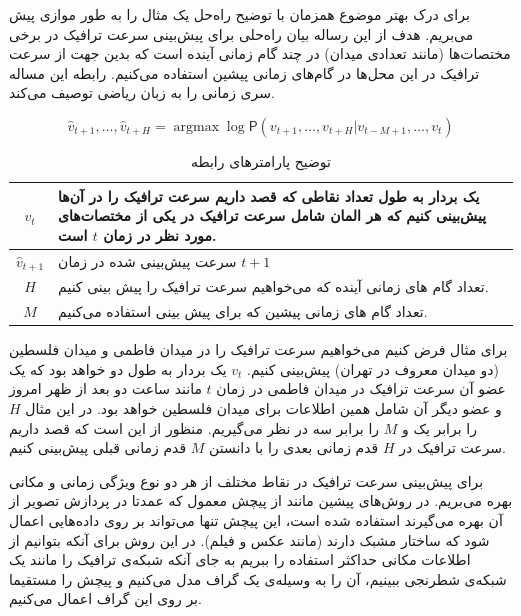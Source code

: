 
برای درک بهتر موضوع همزمان با توضیح راه‌حل یک مثال را به طور موازی پیش می‌بریم.
هدف از این رساله بیان راه‌حلی برای پیش‌بینی سرعت ترافیک در برخی مختصات‌ها (مانند تعدادی میدان) در چند گام زمانی آینده است که
بدین جهت از سرعت ترافیک در این محل‌ها در گام‌های زمانی پیشین استفاده می‌کنیم. رابطه  این مساله سری زمانی را به زبان ریاضی توصیف می‌کند.

\begin{equation}
  \label{eq:base}
  \hat{v}_{t+1}, \ldots,  \hat{v}_{t+H} = \mathop{\mathrm{argmax}} \log \mathsf{P}({v}_{t+1}, \ldots,  v_{t+H} | v_{t-M+1} , \ldots,  v_{t})
\end{equation}

\begin{table}[h]
  \centering
  \caption{توضیح پارامترهای رابطه }
  \begin{tabular}{|c|p{}|}
    \hline
    $v_{t}$ & یک بردار به طول تعداد نقاطی که قصد داریم سرعت ترافیک را در آن‌ها پیش‌بینی کنیم که هر المان شامل سرعت ترافیک در یکی از مختصات‌های مورد نظر در زمان $t$ است. \\
    \hline
    $\hat{v}_{t+1}$ & سرعت پیش‌بینی شده در زمان $t+1$ \\
    \hline
    $H$ & تعداد گام های زمانی آینده که می‌خواهیم سرعت ترافیک را پیش بینی کنیم. \\
    \hline
    $M$ & تعداد گام های زمانی پیشین که برای پیش بینی استفاده می‌کنیم. \\
    \hline
  \end{tabular}
  \label{tbl:base}
\end{table}

برای مثال فرض کنیم می‌خواهیم سرعت ترافیک را در میدان فاطمی و میدان فلسطین (دو میدان معروف در تهران) پیش‌بینی کنیم.
$v_{t}$ یک بردار به طول دو خواهد بود که یک عضو آن سرعت ترافیک در میدان فاطمی در زمان $t$ مانند ساعت دو بعد از ظهر امروز و عضو دیگر آن شامل همین اطلاعات برای میدان فلسطین خواهد بود.
در این مثال $H$ را برابر یک و $M$ را برابر سه در نظر می‌گیریم. منظور از  این است که قصد داریم سرعت ترافیک در $H$ قدم زمانی بعدی را با دانستن $M$ قدم زمانی قبلی پیش‌بینی کنیم.

برای پیش‌بینی سرعت ترافیک در نقاط مختلف از هر دو نوع ویژگی زمانی و مکانی بهره می‌بریم.
در روش‌های پیشین مانند  از پیچش معمول که عمدتا در پردازش تصویر از آن بهره می‌گیرند استفاده شده است، این پیچش تنها می‌تواند بر روی داده‌هایی اعمال شود که ساختار مشبک دارند (مانند عکس و فیلم).
در این روش برای آنکه بتوانیم از اطلاعات مکانی حداکثر استفاده را ببریم به جای آنکه شبکه‌ی ترافیک را مانند یک شبکه‌‌ی شطرنجی ببینیم،
آن را به وسیله‌ی یک گراف مدل می‌کنیم و پیچش را مستقیما بر روی این گراف اعمال می‌کنیم.

